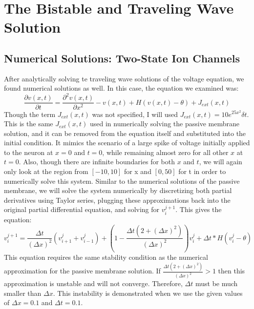 \documentclass[12pt]{article}
\begin{document}
\section{The Bistable and Traveling Wave Solution}

\subsection{Numerical Solutions: Two-State Ion Channels}
After analytically solving te traveling wave solutions of the voltage equation, we found numerical solutions as well. In this case, the equation we examined was:
\[\frac{\partial{v(x,t)}}{\partial{t}}=\frac{\partial^2{v(x,t)}}{\partial{x}^2}-v(x,t)+H(v(x,t)-\theta)+J_{ext}(x,t)\]
Though the term $J_{ext}(x,t)$ was not specified, I will used $J_{ext}(x,t)=10e^{25x^2}\delta{t}$. This is the same $J_{ext}(x,t)$ used in numerically solving the passive membrane solution, and it can be removed from the equation itself and substituted into the initial condition. It mimics the scenario of a large spike of voltage initially applied to the neuron at $x=0$ and $t=0$, while remaining almost zero for all other $x$ at $t=0$. Also, though there are infinite boundaries for both $x$ and $t$, we will again only look at the region from $[-10,10]$ for x and $[0,50]$ for t in order to numerically solve this system.  Similar to the numerical solutions of the passive membrane, we will solve the system numerically by discretizing both partial derivatives using Taylor series, plugging these approximations back into the original partial differential equation, and solving for $v^{j+1}_i$. This gives the equation:
\begin{equation} \label{**}
v^{j+1}_i=\frac{\Delta{t}}{(\Delta{x})^2}(v^{j}_{i+1}+v^{j}_{i-1})+(1-\frac{\Delta{t}(2+(\Delta{x})^2)}{(\Delta{x})^2})v^{j}_{i}+\Delta{t}*H(v^j_i-\theta)
\end {equation}
This equation requires the same stability condition as the numerical approximation for the passive membrane solution. If $\frac{\Delta{t}(2+(\Delta{x})^2)}{(\Delta{x})^2}>1$ then this approximation is unstable and will not converge. Therefore, $\Delta{t}$ must be much smaller than $\Delta{x}$. This instability is demonstrated when we use the given values of $\Delta{x}=0.1$ and $\Delta{t}=0.1$. 
\end{document}

